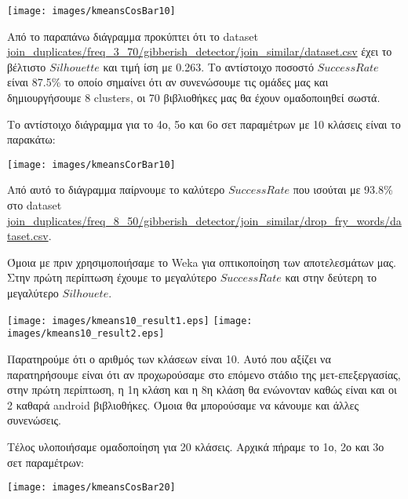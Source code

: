 \noindent\begin{minipage}{\linewidth}
    \centering
    \texttt{[image: images/kmeansCosBar10]}
    \label{fig:kmeansCosBar10}
\end{minipage}

Από το παραπάνω διάγραμμα προκύπτει ότι το dataset \url{join_duplicates/freq_3_70/gibberish_detector/join_similar/dataset.csv} έχει το βέλτιστο $Silhouette$ και τιμή ίση με 0.263. Το αντίστοιχο ποσοστό $SuccessRate$ είναι 87.5\% το οποίο σημαίνει ότι αν συνενώσουμε τις ομάδες μας και δημιουργήσουμε 8 clusters, οι 70 βιβλιοθήκες μας θα έχουν ομαδοποιηθεί σωστά.

Το αντίστοιχο διάγραμμα για το 4ο, 5ο και 6ο σετ παραμέτρων με 10 κλάσεις είναι το παρακάτω:\\
\noindent\begin{minipage}{\linewidth}
    \centering
    \texttt{[image: images/kmeansCorBar10]}
    \label{fig:kmeansCorBar10}
\end{minipage}

Από αυτό το διάγραμμα παίρνουμε το καλύτερο $SuccessRate$ που ισούται με 93.8\% στο dataset \url{join_duplicates/freq_8_50/gibberish_detector/join_similar/drop_fry_words/dataset.csv}.

Όμοια με πριν χρησιμοποιήσαμε το Weka για οπτικοποίηση των αποτελεσμάτων μας. Στην πρώτη περίπτωση έχουμε το μεγαλύτερο $Success Rate$ και στην δεύτερη το μεγαλύτερο $Silhouete$.

\noindent\begin{minipage}{\linewidth}
    \centering
    \texttt{[image: images/kmeans10\_result1.eps]}
    \texttt{[image: images/kmeans10\_result2.eps]}
    \label{fig:kmeans10_result}
\end{minipage}

Παρατηρούμε ότι ο αριθμός των κλάσεων είναι 10. Αυτό που αξίζει να παρατηρήσουμε είναι ότι αν προχωρούσαμε στο επόμενο στάδιο της μετ-επεξεργασίας, στην πρώτη περίπτωση, η 1η κλάση και η 8η κλάση θα ενώνονταν καθώς είναι και οι 2 καθαρά android βιβλιοθήκες. Όμοια θα μπορούσαμε να κάνουμε και άλλες συνενώσεις.

Τέλος υλοποιήσαμε ομαδοποίηση για 20 κλάσεις. Αρχικά πήραμε το 1ο, 2ο και 3ο σετ παραμέτρων:\\
\noindent\begin{minipage}{\linewidth}
    \centering
    \texttt{[image: images/kmeansCosBar20]}
    \label{fig:kmeansCosBar20}
\end{minipage}

